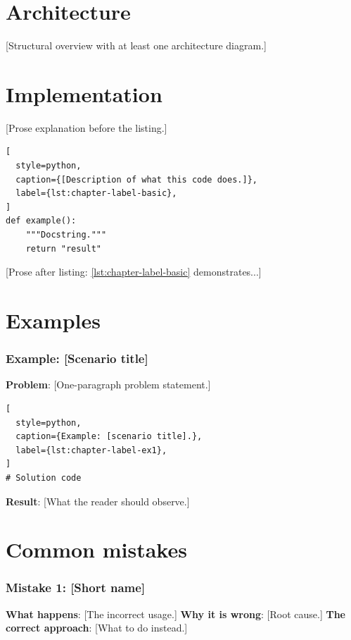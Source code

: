 \section{Architecture}
\label{sec:chapter-label-architecture}

[Structural overview with at least one architecture diagram.]

\section{Implementation}
\label{sec:chapter-label-implementation}

[Prose explanation before the listing.]

\begin{lstlisting}[
  style=python,
  caption={[Description of what this code does.]},
  label={lst:chapter-label-basic},
]
def example():
    """Docstring."""
    return "result"
\end{lstlisting}

[Prose after listing: \autoref{lst:chapter-label-basic} demonstrates...]

\section{Examples}
\label{sec:chapter-label-examples}

\subsubsection{Example: [Scenario title]}

\textbf{Problem}: [One-paragraph problem statement.]

\begin{lstlisting}[
  style=python,
  caption={Example: [scenario title].},
  label={lst:chapter-label-ex1},
]
# Solution code
\end{lstlisting}

\textbf{Result}: [What the reader should observe.]

\section{Common mistakes}
\label{sec:chapter-label-mistakes}

\subsubsection{Mistake 1: [Short name]}
\textbf{What happens}: [The incorrect usage.]
\textbf{Why it is wrong}: [Root cause.]
\textbf{The correct approach}: [What to do instead.]

